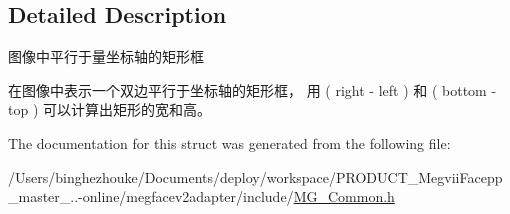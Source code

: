 \subsection{Detailed Description}
图像中平行于量坐标轴的矩形框 

在图像中表示一个双边平行于坐标轴的矩形框， 用 ( right -\/ left ) 和 ( bottom -\/ top ) 可以计算出矩形的宽和高。 

The documentation for this struct was generated from the following file\+:\begin{DoxyCompactItemize}
\item 
/\+Users/binghezhouke/\+Documents/deploy/workspace/\+P\+R\+O\+D\+U\+C\+T\+\_\+\+Megvii\+Facepp\+\_\+master\+\_..-\/online/megfacev2adapter/include/\hyperlink{_m_g___common_8h}{M\+G\+\_\+\+Common.\+h}\end{DoxyCompactItemize}
